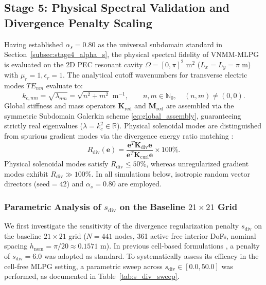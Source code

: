 \documentclass[VANCOUVER,Times1COL]{WileyNJD-v5}
\begin{document}
\subsection{Stage 5: Physical Spectral Validation and Divergence Penalty Scaling}
\label{subsec:stage5_cavity}

Having established $\alpha_s = 0.80$ as the universal subdomain standard in Section~\ref{subsec:stage4_alpha_s}, the physical spectral fidelity of VNMM-MLPG is evaluated on the 2D PEC resonant cavity $\Omega = [0, \pi]^2\text{ m}^2$ ($L_x = L_y = \pi\text{ m}$) with $\mu_r = 1, \epsilon_r = 1$. The analytical cutoff wavenumbers for transverse electric modes $TE_{nm}$ evaluate to:
\begin{equation}
    k_{c, nm} = \sqrt{\lambda_{nm}} = \sqrt{n^2 + m^2}\text{ m}^{-1}, \qquad n, m \in \mathbb{N}_0, \quad (n, m) \ne (0, 0).
    \label{eq:analytical_cavity_kc}
\end{equation}
Global stiffness and mass operators $\mathbf{K}_{\mathrm{red}}$ and $\mathbf{M}_{\mathrm{red}}$ are assembled via the symmetric Subdomain Galerkin scheme \eqref{eq:global_assembly}, guaranteeing strictly real eigenvalues ($\lambda = k_c^2 \in \mathbb{R}$). Physical solenoidal modes are distinguished from spurious gradient modes via the divergence energy ratio matching \cite{stable_vnmm2d_2026}:
\begin{equation}
    R_{\mathrm{div}}(\mathbf{e}) = \frac{\mathbf{e}^T \mathbf{K}_{\mathrm{div}} \mathbf{e}}{\mathbf{e}^T \mathbf{K}_{\mathrm{curl}} \mathbf{e}} \times 100\%.
    \label{eq:R_div_definition}
\end{equation}
Physical solenoidal modes satisfy $R_{\mathrm{div}} \le 50\%$, whereas unregularized gradient modes exhibit $R_{\mathrm{div}} \gg 100\%$. In all simulations below, isotropic random vector directors ($\text{seed}=42$) and $\alpha_s = 0.80$ are employed.

\subsubsection{Parametric Analysis of $s_{\mathrm{div}}$ on the Baseline $21\times 21$ Grid}
\label{subsubsec:s_div_sweep}

We first investigate the sensitivity of the divergence regularization penalty $s_{\mathrm{div}}$ on the baseline $21 \times 21$ grid ($N = 441$ nodes, 361 active free interior DoFs, nominal spacing $h_{\mathrm{nom}} = \pi/20 \approx 0.1571\text{ m}$). In previous cell-based formulations \cite{stable_vnmm2d_2026}, a penalty of $s_{\mathrm{div}} = 6.0$ was adopted as standard. To systematically assess its efficacy in the cell-free MLPG setting, a parametric sweep across $s_{\mathrm{div}} \in [0.0, 50.0]$ was performed, as documented in Table~\ref{tab:s_div_sweep}.
\end{document}
